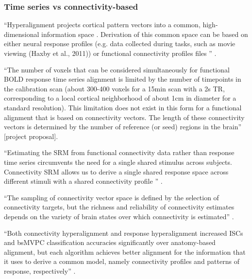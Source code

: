 \subsubsection{Time series vs connectivity-based}




``Hyperalignment projects cortical pattern vectors into a common,
high-dimensional information space \citep{haxby2020hyperalignment}.
%
Derivation of this common space can be based on either neural response profiles
(e.g. data collected during tasks, such as movie viewing (Haxby et al., 2011))
or functional connectivity profiles files \citep{guntupalli2018computational}''
\citep{busch2021hybrid}.

``The number of voxels that can be considered simultaneously for functional BOLD
response time series alignment is limited by the number of timepoints in the
calibration scan (about 300-400 voxels for a 15min scan with a 2s TR,
corresponding to a local cortical neighborhood of about 1cm in diameter for a
standard resolution).
%
This limitation does not exist in this form for a functional alignment that is
based on connectivity vectors.
%
The length of these connectivity vectors is determined by the number of
reference (or seed) regions in the brain'' [project proposal].


``Estimating the SRM from functional connectivity data rather than response time
series circumvents the need for a single shared stimulus across subjects.
%
Connectivity SRM allows us to derive a single shared response space across
different stimuli with a shared connectivity profile
\citep{nastase2019leveraging}'' \citep{kumar2020brainiak}.

%
``The sampling of connectivity vector space is defined by the selection of
connectivity targets, but the richness and reliability of connectivity estimates
depends on the variety of brain states over which connectivity is estimated''
\citep{haxby2020hyperalignment}.

%
``Both connectivity hyperalignment and response hyperalignment increased ISCs
and bsMVPC classification accuracies significantly over anatomy-based alignment,
but each algorithm achieves better alignment for the information that it uses to
derive a common model, namely connectivity profiles and patterns of response,
respectively'' \citep{guntupalli2018computational}.



